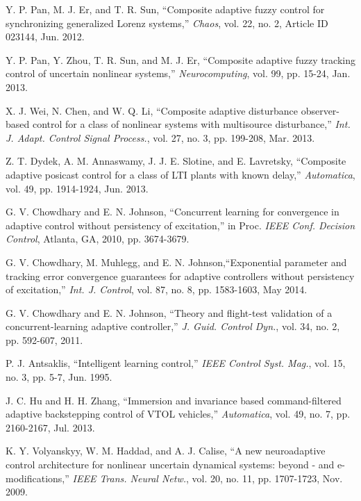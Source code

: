 \documentclass[conference]{IEEEtran}
\begin{document}
\begin{thebibliography}{99}
 Y. P. Pan, M. J. Er, and T. R. Sun, ``Composite adaptive fuzzy control for synchronizing generalized Lorenz systems,'' \textit{Chaos}, vol. 22, no. 2, Article ID 023144, Jun. 2012.

 Y. P. Pan, Y. Zhou, T. R. Sun, and M. J. Er, ``Composite adaptive fuzzy  tracking control of uncertain nonlinear systems,'' \textit{Neurocomputing}, vol. 99, pp. 15-24, Jan. 2013.

 X. J. Wei, N. Chen, and W. Q. Li, ``Composite adaptive disturbance observer-based control for a class of nonlinear systems with multisource disturbance,'' \textit{Int. J. Adapt. Control Signal Process.}, vol. 27, no. 3, pp. 199-208, Mar. 2013.

 Z. T. Dydek, A. M. Annaswamy, J. J. E. Slotine, and E. Lavretsky, ``Composite adaptive posicast control for a class of LTI plants with known delay,'' \textit{Automatica}, vol. 49, pp. 1914-1924, Jun. 2013.


 G. V. Chowdhary and E. N. Johnson, ``Concurrent learning for convergence in adaptive control without persistency of excitation,'' in Proc. \textit{IEEE Conf. Decision Control}, Atlanta, GA, 2010, pp. 3674-3679.

 G. V. Chowdhary, M. Muhlegg, and E. N. Johnson,``Exponential parameter and tracking error convergence guarantees for adaptive controllers without persistency of excitation,'' \textit{Int. J. Control}, vol. 87, no. 8, pp. 1583-1603, May 2014.

 G. V. Chowdhary and E. N. Johnson, ``Theory and flight-test validation of a concurrent-learning adaptive controller,'' \textit{J. Guid. Control Dyn.}, vol. 34, no. 2, pp. 592-607, 2011.

 P. J. Antsaklis, ``Intelligent learning control,'' \textit{IEEE Control Syst. Mag.}, vol. 15, no. 3, pp. 5-7, Jun. 1995.

 J. C. Hu and H. H. Zhang, ``Immersion and invariance based command-filtered adaptive backstepping control of VTOL vehicles,'' \textit{Automatica}, vol. 49, no. 7, pp. 2160-2167, Jul. 2013.

 K. Y. Volyanskyy, W. M. Haddad, and A. J. Calise, ``A new neuroadaptive control architecture for nonlinear uncertain dynamical systems: beyond - and e-modifications,'' \textit{IEEE Trans. Neural Netw.}, vol. 20, no. 11, pp. 1707-1723, Nov. 2009.


\end{thebibliography}
\end{document}
